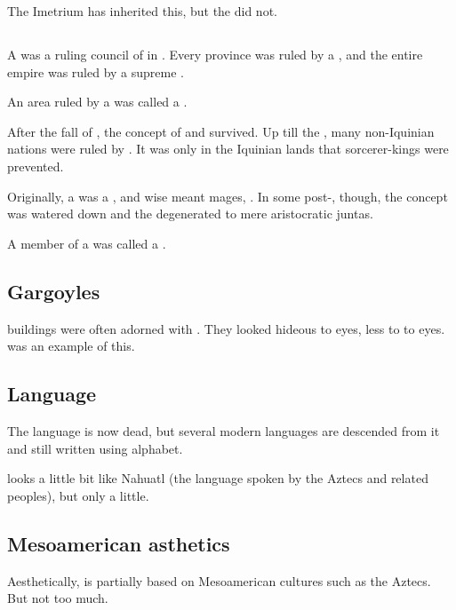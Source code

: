 The Imetrium has inherited this, but the  did not. 




\subsection{\Baccons}
\index{\bacconate}
\index{\baccon}
A \baccon was a ruling council of \rethyaxes in \Ortaica. 
Every \Ortaican province was ruled by a \baccon, and the entire \Ortaican empire was ruled by a supreme \baccon. 

An area ruled by a \baccon{} was called a \bacconate. 

After the fall of \Ortaica, the concept of \baccons and \bacconates survived. 
Up till the \thirdbanewar, many non-Iquinian nations were ruled by \rethyaxes.
It was only in the Iquinian lands that sorcerer-kings were prevented. 

Originally, a \baccon was a , and wise meant mages, \rethyaxes.
In some post-\Ortaican \bacconates, though, the concept was watered down and the \baccons degenerated to mere aristocratic juntas. 

A member of a \baccon{} was called a .





\subsection{Gargoyles}
\Ortaican buildings were often adorned with .
They looked hideous to \human eyes, less to to \scathaese eyes.
\Forclin was an example of this.





\subsection{Language}
The \Ortaican{} language is now dead, but several modern languages are descended from it and still written using \Ortaican{} alphabet. 

\Ortaican looks a little bit like Nahuatl (the language spoken by the Aztecs and related peoples), but only a little.





\subsection{Mesoamerican asthetics}
Aesthetically, \Ortaica is partially based on Mesoamerican cultures such as the Aztecs.
But not too much.









